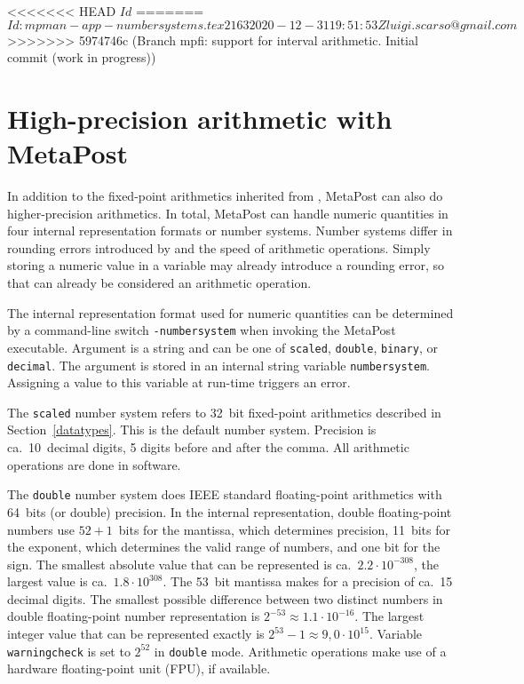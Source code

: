 <<<<<<< HEAD
\svnInfo $Id$
=======
\svnInfo $Id: mpman-app-numbersystems.tex 2163 2020-12-31 19:51:53Z luigi.scarso@gmail.com $
>>>>>>> 5974746c (Branch mpfi: support for interval arithmetic. Initial commit (work in progress))
\section{High-precision arithmetic with MetaPost}
\label{hparith}

In addition to the fixed-point arithmetics inherited from \MF, MetaPost
can also do higher-precision arithmetics.  In total, MetaPost can handle
numeric quantities in four internal representation formats or number
systems.  Number systems differ in rounding errors
introduced by and the speed of arithmetic operations.  Simply storing a
numeric value in a variable may already introduce a rounding error, so
that can already be considered an arithmetic operation.

The internal representation format used for numeric quantities can be
determined by a command-line switch
\texttt{-numbersystem}
when invoking the MetaPost executable.  Argument is a string and can be
one of \texttt{scaled}, \texttt{double}, \texttt{binary}, or
\texttt{decimal}.  The argument is stored in an internal string variable
\texttt{numbersystem}\label{Dnumbersystem}.
Assigning a value to this variable at run-time triggers an error.

The \texttt{scaled} number system refers
to 32~bit fixed-point arithmetics described in Section~\ref{datatypes}.
This is the default number system.  Precision is ca.~10~decimal digits,
5 digits before and after the comma.  All arithmetic operations are done
in software.

The \texttt{double} number system does
IEEE standard floating-point arithmetics with 64~bits (or double)
precision.  In the internal representation, double floating-point
numbers use $52+1$~bits for the mantissa, which determines precision,
11~bits for the exponent, which determines the valid range of numbers,
and one bit for the sign.  The smallest absolute value that can be
represented is ca.~$2.2\cdot10^{-308}$, the largest value is
ca.~$1.8\cdot10^{308}$.  The 53~bit mantissa makes for a precision of
ca.~15 decimal digits.  The smallest possible difference between two
distinct numbers in double floating-point number representation is
$2^{-53} \approx 1.1\cdot10^{-16}$.  The largest integer value that can
be represented exactly is $2^{53}-1 \approx 9,0\cdot10^{15}$.  Variable
\texttt{warningcheck} is set
to $2^{52}$ in \texttt{double} mode.  Arithmetic operations make use of
a hardware floating-point unit (FPU), if available.

